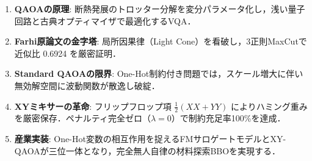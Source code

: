 \documentclass[11pt,a4paper,oneside,openany]{ltjsbook}
\theoremstyle{definition}
\theoremstyle{plain}
\theoremstyle{remark}
\newenvironment{pointbox}[1][]{\begin{insightbox}[#1]}{\end{insightbox}}
\begin{document}
\begin{pointbox}[本教材の要点総括]
\begin{enumerate}\setlength{\itemsep}{0pt}\setlength{\parskip}{0pt}
    \item \textbf{QAOAの原理}: 断熱発展のトロッター分解を変分パラメータ化し，浅い量子回路と古典オプティマイザで最適化するVQA．
    \item \textbf{Farhi原論文の金字塔}: 局所因果律（Light Cone）を看破し，3正則MaxCutで近似比 0.6924 を厳密証明．
    \item \textbf{Standard QAOAの限界}: One-Hot制約付き問題では，スケール増大に伴い無効解空間に波動関数が散逸し破綻．
    \item \textbf{XYミキサーの革命}: フリップフロップ項 $\frac{1}{2}(XX+YY)$ によりハミング重みを厳密保存．ペナルティ完全ゼロ（$\lambda=0$）で制約充足率100\%を達成．
    \item \textbf{産業実装}: One-Hot変数の相互作用を捉えるFMサロゲートモデルとXY-QAOAが三位一体となり，完全無人自律の材料探索BBOを実現する．
\end{enumerate}
\end{pointbox}
\end{document}
